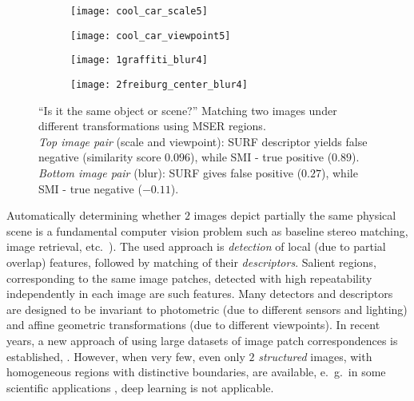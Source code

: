 \documentclass[a4paper,11pt]{article}
\begin{document}
\begin{wrapfigure}{r}{0.5\textwidth}
 \vspace{-22pt} 
\begin{center}
\begin{subfigure}[b]{0.22\textwidth}
  \texttt{[image: cool\_car\_scale5]}
\end{subfigure}
\begin{subfigure}[b]{0.22\textwidth}
\texttt{[image: cool\_car\_viewpoint5]}
\end{subfigure}
\end{center}
\vspace{-22pt}
\begin{center}
\begin{subfigure}[b]{0.22\textwidth}
  \texttt{[image: 1graffiti\_blur4]}
\end{subfigure}
\begin{subfigure}[b]{0.22\textwidth}
\texttt{[image: 2freiburg\_center\_blur4]}
\end{subfigure}
\end{center}
\vspace{-20pt}
\caption{\small ``Is it the same object or scene?'' Matching two images under different transformations using MSER regions.\\ {\em Top image pair} (scale and viewpoint): SURF descriptor yields false negative (similarity score $0.096$), while SMI - true positive ($0.89$).
{\em Bottom image pair} (blur): SURF gives false positive ($0.27$), while SMI - true negative ($-0.11$).}
\label{fig:intro1}
  \vspace{-16pt}
\end{wrapfigure}

Automatically determining whether $2$ images depict partially the same physical scene is a fundamental computer vision problem such as baseline stereo matching, image retrieval, etc.~\cite{EscaleraCVPR07,Matas2002BMVC}). The used approach is {\em detection} of local (due to partial overlap) features, followed by matching of their {\em descriptors}. %
 Salient regions, corresponding to the same image patches, detected with high repeatability independently in each image are such features. Many detectors and descriptors are designed to be invariant to photometric (due to different sensors and lighting) and affine geometric transformations (due to different viewpoints). In recent years, a new approach of using large datasets of image patch correspondences is established, \cite{Snavely2008, ZagoruykoK15}. However, when very few, even only $2$ {\em structured} images, with homogeneous regions with distinctive boundaries, are available, e.~g.~in some scientific applications \cite{Ranguelova2016AICCSA}, deep learning is not applicable.
\end{document}
